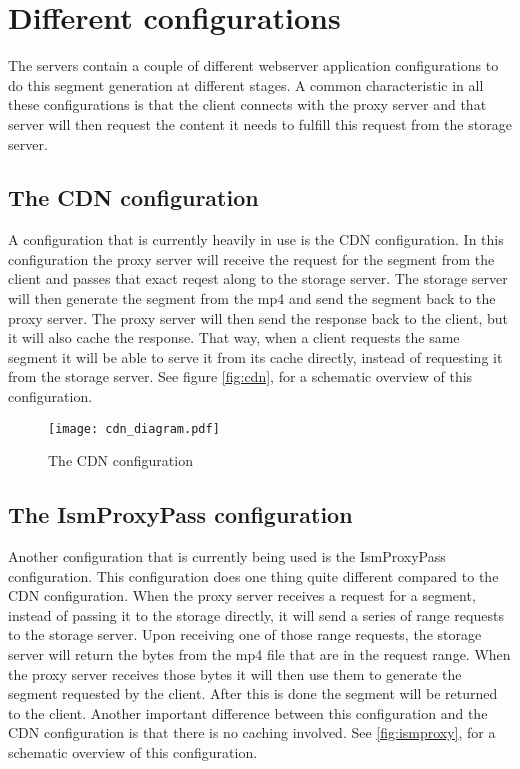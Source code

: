 \documentclass[twoside,openright]{uva-bachelor-thesis}
\begin{document}
\section{Different configurations}
The servers contain a couple of different webserver application configurations
to do this segment generation at different stages. A common characteristic in
all these configurations is that the client connects with the proxy server and
that server will then request the content it needs to fulfill this request from
the storage server.


\subsection{The CDN configuration}
A configuration that is currently heavily in use is the CDN configuration. In
this configuration the proxy server will receive the request for the segment
from the client and passes that exact reqest along to the storage server. The
storage server will then generate the segment from the mp4 and send the segment
back to the proxy server.  The proxy server will then send the response back to
the client, but it will also cache the response. That way, when a client
requests the same segment it will be able to serve it from its cache directly,
instead of requesting it from the storage server.
See figure \vref{fig:cdn}, for a schematic overview of this configuration.
\begin{figure}
    \texttt{[image: cdn\_diagram.pdf]}
    \caption{The CDN configuration}
    \label{fig:cdn}
\end{figure}



\subsection{The IsmProxyPass configuration}
Another configuration that is currently being used is the IsmProxyPass
configuration. This configuration does one thing quite different compared to the
CDN configuration. When the proxy server receives a request for a segment,
instead of passing it to the storage directly, it will send a series of range
requests to the storage server. Upon receiving one of those range requests, the
storage server will return the bytes from the mp4 file that are in the request
range. When the proxy server receives those bytes it will then use them to
generate the segment requested by the client. After this is done the segment
will be returned to the client. Another important difference between this
configuration and the CDN configuration is that there is no caching involved.
See \vref{fig:ismproxy}, for a schematic overview of this configuration.
\end{document}
